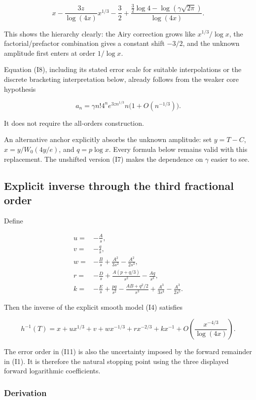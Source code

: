 \documentclass[11pt,letterpaper]{article}
\numberwithin{equation}{section}
\theoremstyle{remark}
\begin{document}
\[
x-\frac{3z}{\log(4x)}x^{1/3}-\frac32
+\frac{\frac32\log4-\log(\gamma\sqrt{2\pi})}{\log(4x)}.
\tag{I9}
\]

This shows the hierarchy clearly: the Airy correction grows like \(x^{1/3}/\log x\), the factorial/prefactor combination gives a constant shift \(-3/2\), and the unknown amplitude first enters at order \(1/\log x\).

Equation (I8), including its stated error scale for suitable interpolations or the discrete bracketing interpretation below, already follows from the weaker core hypothesis

\[
a_n=\gamma n!4^n e^{3z n^{1/3}}n\bigl(1+O(n^{-1/3})\bigr).
\]

It does not require the all-orders construction.

An alternative anchor explicitly absorbs the unknown amplitude: set \(y=T-C\), \(x=y/W_0(4y/e)\), and \(q=p \log x\). Every formula below remains valid with this replacement. The unshifted version (I7) makes the dependence on \(\gamma\) easier to see.

\subsection{Explicit inverse through the third fractional order}\label{air:rb:explicit-inverse-through-the-third-fractional-order}

Define

\[
\begin{aligned}
u={}&-\frac A s,\\
v={}&-\frac q s,\\
w={}&-\frac B s+\frac{A^2}{3s^2}-\frac{A^2}{2s^3},\\
r={}&-\frac D s+\frac{A(p+q/3)}{s^2}-\frac{Aq}{s^3},\\
k={}&-\frac E s+\frac{pq}{s^2}-\frac{AB+q^2/2}{s^3}
+\frac{A^3}{3s^4}-\frac{A^3}{2s^5}.
\end{aligned}
\tag{I10}
\]

Then the inverse of the explicit smooth model (I4) satisfies

\[
\boxed{\displaystyle
h^{-1}(T)=x+u x^{1/3}+v+w x^{-1/3}+r x^{-2/3}+k x^{-1}
+O\!\left(\frac{x^{-4/3}}{\log(4x)}\right).}
\tag{I11}
\]

The error order in (I11) is also the uncertainty imposed by the forward remainder in (I1). It is therefore the natural stopping point using the three displayed forward logarithmic coefficients.

\subsubsection{Derivation}\label{air:rb:derivation}
\end{document}
